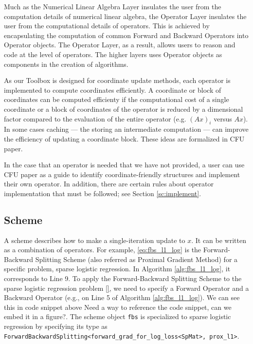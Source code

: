 Much as the Numerical Linear Algebra Layer insulates the user from the computation details of numerical linear algebra, the Operator Layer insulates the user from the computational details of operators. This is achieved by encapsulating the computation of common Forward and Backward Operators into Operator objects.  The Operator Layer, as a result, allows users to reason and code at the level of operators. The higher layers uses Operator objects as components in the creation of algorithms. 

As our Toolbox is designed for coordinate update methods, each operator is implemented to compute coordinates efficiently. A coordinate or block of coordinates can be computed efficienty if the computational cost of a single coordinate or a block of coordinates of the operator is reduced by a dimensional factor compared to the evaluation of the entire operator (e.g. $(Ax)_i$ versus $Ax$). In some cases caching --- the storing an intermediate computation --- can improve the efficiency of updating a coordinate block. These ideas are formalized in CFU paper.

In the case that an operator is needed that we have not provided, a user can use CFU paper as a guide to identify coordinate-friendly structures and implement their own operator. In addition, there are certain rules about operator implementation that must be followed; see Section \ref{sc:implement}.


\subsection{Scheme}
A scheme describes how to make a single-iteration update to $x$.
It can be written as a combination of operators. For example, \eqref{eq:fbs_l1_log} is the Forward-Backward Splitting Scheme (also referred as Proximal Gradient Method) for a specific problem, sparse logistic regression. In Algorithm \ref{alg:fbs_l1_log}, it corresponds to Line 9. To apply the Forward-Backward Splitting Scheme to the sparse logistic regression problem \eqref{}, we need to specify a Forward Operator and a Backward Operator (e.g., on Line 5 of Algorithm \ref{alg:fbs_l1_log}). We can see this in code snippet above {\color{red} Need a way to reference the code snippet, can we embed it in a figure?}.
The scheme object \texttt{fbs} is specialized to sparse logistic regression by specifying its type as \texttt{ForwardBackwardSplitting<forward\_grad\_for\_log\_loss<SpMat>, prox\_l1>}.

